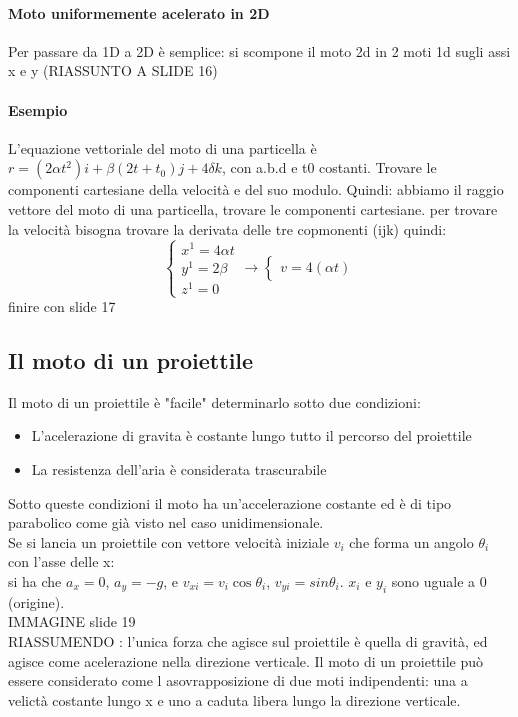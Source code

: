 \documentclass[12pt, a4paper, openany]{book}
\begin{document}
    \paragraph*{Moto uniformemente acelerato in 2D} %
    Per passare da 1D a 2D è semplice: si scompone il moto 2d in 2 moti 1d sugli assi x e y
    (RIASSUNTO A SLIDE 16)

    \paragraph*{Esempio} L'equazione vettoriale del moto di una particella è $r = (2\alpha t^2)i +\beta(2t + t_0)j + 4\delta k$, con a.b.d e t0 costanti. Trovare le componenti cartesiane della velocità e del suo modulo.
Quindi: abbiamo il raggio vettore del moto di una particella, trovare le componenti cartesiane.
per trovare la velocità bisogna trovare la derivata delle tre copmonenti (ijk) quindi:
$$ \begin{cases}
        x^1 = 4\alpha t \\ y^1 = 2\beta \\ z^1 = 0
    \end{cases}
    \to
    \begin{cases}
        v= 4(\alpha t )
    \end{cases}
$$ finire con slide 17

\subsection*{Il moto di un proiettile}
Il moto di un proiettile è "facile" determinarlo sotto due condizioni:
\begin{itemize}
    \item L'acelerazione di gravita è costante lungo tutto il percorso del proiettile
    \item La resistenza dell'aria è considerata trascurabile
\end{itemize}
Sotto queste condizioni il moto ha un'accelerazione costante ed è di tipo parabolico come già visto nel caso unidimensionale.
\\Se si lancia un proiettile con vettore velocità iniziale $v_i$ che forma un angolo $\theta_i$ con l'asse delle x:
\\si ha che $a_x = 0$, $a_y = -g$, e $v_{xi} = v_i \cos \theta_i$, $v_{yi} = sin \theta_i$. $x_i$ e $y_i$ sono uguale a 0 (origine).
\\IMMAGINE slide 19
\\RIASSUMENDO : l'unica forza che agisce sul proiettile è quella di gravità, ed agisce come acelerazione nella direzione verticale.
Il moto di un proiettile può essere considerato come l asovrapposizione di due moti indipendenti: una a velictà costante lungo x e uno a caduta libera lungo la direzione verticale.
\end{document}
